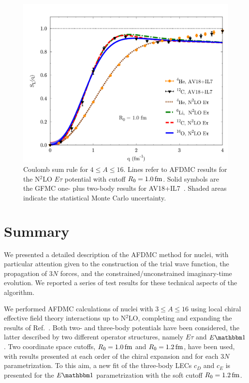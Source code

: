 \documentclass[aps,prc,twocolumn,superscriptaddress,floatfix]{revtex4-1}
\begin{document}
\begin{figure}[htb]
\includegraphics[width=\linewidth]{sl.pdf}
\caption[]{Coulomb sum rule for $4\le A\le16$.
Lines refer to AFDMC results for the N$^2$LO $E\tau$ potential with cutoff $R_0=1.0\,\rm fm$.
Solid symbols are the GFMC one- plus two-body results for AV18+IL7~\cite{Lovato:2013,Lonardoni:2017cvmc}. 
Shaded areas indicate the statistical Monte Carlo uncertainty.}
\label{fig:sl}
\end{figure}


\section{Summary}
\label{sec:summ}
We presented a detailed description of the AFDMC method for nuclei, 
with particular attention given to the construction of the trial wave function, the propagation 
of $3N$ forces, and the constrained/unconstrained imaginary-time evolution. 
We reported a series of test results for these technical aspects of the algorithm.

We performed AFDMC calculations of nuclei with $3\leq A\leq16$ using local chiral 
effective field theory interactions up to N$^2$LO, completing and expanding the 
results of Ref.~\cite{Lonardoni:2017afdmc}.
Both two- and three-body potentials have been considered, the latter described by
two different operator structures, namely $E\tau$ and $E\mathbbm1$. Two coordinate 
space cutoffs, $R_0=1.0\,\rm fm$ and $R_0=1.2\,\rm fm$, have been used, with 
results presented at each order of the chiral expansion and for each $3N$ parametrization. 
To this aim, a new fit of the three-body LECs $c_D$ and $c_E$ is presented for the 
$E\mathbbm1$ parametrization with the soft cutoff $R_0=1.2\,\rm fm$.
\end{document}
